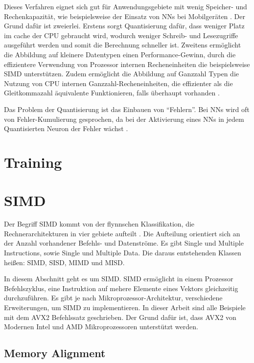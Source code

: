 Dieses Verfahren eignet sich gut für Anwendungsgebiete mit wenig Speicher- und Rechenkapazität, wie beispielsweise der Einsatz von \acp{NN} bei Mobilgeräten \cite{MaQuantization2019, Gysel2016}. Der Grund dafür ist zweierlei. Erstens sorgt Quantisierung dafür, dass weniger Platz im cache der CPU gebraucht wird, wodurch weniger Schreib- und Lesezugriffe ausgeführt werden und somit die Berechnung schneller ist. Zweitens ermöglicht die Abbildung auf kleinere Datentypen einen Performance-Gewinn, durch die effizientere Verwendung von Prozessor internen Recheneinheiten die beispielsweise \ac{SIMD} unterstützen. Zudem ermöglicht die Abbildung auf Ganzzahl Typen die Nutzung von CPU internen Ganzzahl-Recheneinheiten, die effizienter als die Gleitkommazahl äquivalente Funktionieren, falls überhaupt vorhanden \cite{Jacob2017}.

Das Problem der Quantisierung ist das Einbauen von \enquote{Fehlern}. Bei \acp{NN} wird oft von Fehler-Kumulierung gesprochen, da bei der Aktivierung eines \acp{NN} in jedem Quantisierten Neuron der Fehler wächst \cite{Park2018}.

\section{Training}

\section{SIMD}

Der Begriff \ac{SIMD} kommt von der flynnschen Klassifikation, die Rechnerarchitekturen in vier gebiete aufteilt \cite{Flynn1972}. Die Aufteilung orientiert sich an der Anzahl vorhandener Befehls- und Datenströme. Es gibt Single und Multiple Instructions, sowie Single und Multiple Data. Die daraus entstehenden Klassen heißen: \acs{SIMD}, \acs{SISD}, \acs{MIMD} und {MISD}.

In diesem Abschnitt geht es um \ac{SIMD}. \ac{SIMD} ermöglicht in einem Prozessor Befehlszyklus, eine Instruktion auf mehere Elemente eines Vektors gleichzeitig durchzuführen. Es gibt je nach Mikroprozessor-Architektur, verschiedene Erweiterungen, um \ac{SIMD} zu implementieren. In dieser Arbeit sind alle Beispiele mit dem \ac{AVX2} Befehlssatz geschrieben. Der Grund dafür ist, dass \ac{AVX2} von Modernen Intel und AMD Mikroprozessoren unterstützt werden.


\subsection{Memory Alignment}


